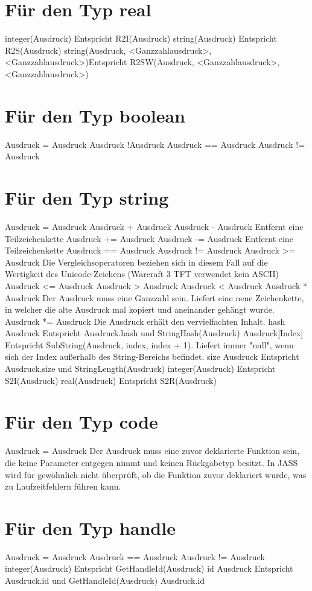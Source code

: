 \section{Für den Typ real}
integer(Ausdruck)					Entspricht R2I(Ausdruck)
string(Ausdruck)					Entspricht R2S(Ausdruck)
string(Ausdruck, <Ganzzahlausdruck>, <Ganzzahlausdruck>)Entspricht R2SW(Ausdruck, <Ganzzahlausdruck>, <Ganzzahlausdruck>)

\section{Für den Typ boolean}
Ausdruck = Ausdruck
Ausdruck
!Ausdruck
Ausdruck == Ausdruck
Ausdruck != Ausdruck

\section{Für den Typ string}
Ausdruck = Ausdruck
Ausdruck + Ausdruck
Ausdruck - Ausdruck				Entfernt eine Teilzeichenkette
Ausdruck += Ausdruck
Ausdruck -= Ausdruck				Entfernt eine Teilzeichenkette
Ausdruck == Ausdruck
Ausdruck != Ausdruck
Ausdruck >= Ausdruck				Die Vergleichsoperatoren beziehen sich in diesem Fall auf die Wertigkeit des Unicode-Zeichens (Warcraft 3 TFT verwendet kein ASCII)
Ausdruck <= Ausdruck
Ausdruck > Ausdruck
Ausdruck < Ausdruck
Ausdruck * Ausdruck				Der Ausdruck muss eine Ganzzahl sein. Liefert eine neue Zeichenkette, in welcher die alte Ausdruck mal kopiert und aneinander gehängt wurde.
Ausdruck *= Ausdruck				Die Ausdruck erhält den vervielfachten Inhalt.
hash Ausdruck					Entspricht Ausdruck.hash und StringHash(Ausdruck)
Ausdruck[Index]					Entspricht SubString(Ausdruck, index, index + 1). Liefert immer "null", wenn sich der Index außerhalb des String-Bereichs befindet.
size Ausdruck					Entspricht Ausdruck.size und StringLength(Ausdruck)
integer(Ausdruck)				Entspricht S2I(Ausdruck)
real(Ausdruck)					Entspricht S2R(Ausdruck)

\section{Für den Typ code}
Ausdruck = Ausdruck				Der Ausdruck muss eine zuvor deklarierte Funktion sein, die keine Parameter entgegen nimmt und keinen Rückgabetyp besitzt. In JASS wird für gewöhnlich nicht überprüft, ob die Funktion zuvor deklariert wurde, was zu Laufzeitfehlern führen kann.

\section{Für den Typ handle}
Ausdruck = Ausdruck
Ausdruck == Ausdruck
Ausdruck != Ausdruck
integer(Ausdruck)				Entspricht GetHandleId(Ausdruck)
id Ausdruck					Entspricht Ausdruck.id und GetHandleId(Ausdruck)
Ausdruck.id

